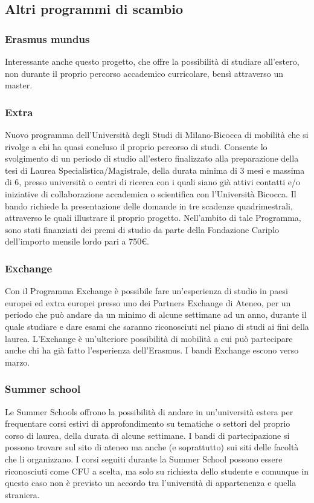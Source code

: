 \subsection{Altri programmi di scambio}
\subsubsection{Erasmus mundus}
Interessante anche questo progetto, che offre la possibilità di studiare all'estero, non durante il proprio percorso accademico curricolare, bensì attraverso un master. 

\subsubsection{Extra}
Nuovo programma dell'Università degli Studi di Milano-Bicocca di mobilità che si rivolge a chi ha quasi concluso il proprio percorso di studi. Consente lo svolgimento di un periodo di studio all'estero finalizzato alla preparazione della tesi di Laurea Specialistica/Magistrale, della durata minima di 3 mesi e massima di 6, presso università o centri di ricerca con i quali siano già attivi contatti e/o iniziative di collaborazione accademica o scientifica con l'Università Bicocca. 
Il bando richiede la presentazione delle domande in tre scadenze quadrimestrali, attraverso le quali illustrare il proprio progetto. Nell'ambito di tale Programma, sono stati finanziati dei premi di studio da parte della Fondazione Cariplo dell'importo mensile lordo pari a 750€. 

\subsubsection{Exchange}
Con il Programma Exchange è possibile fare un'esperienza di studio in paesi europei ed extra europei presso uno dei Partners Exchange di Ateneo, per un periodo che può andare da un minimo di alcune settimane ad un anno, durante il quale studiare e dare esami che saranno riconosciuti nel piano di studi ai fini della laurea. L'Exchange è un'ulteriore possibilità di mobilità a cui può partecipare anche chi ha già fatto l'esperienza dell'Erasmus. I bandi Exchange escono verso marzo. 

\subsubsection{Summer school}
Le Summer Schools offrono la possibilità di andare in un'università estera per frequentare corsi estivi di approfondimento su tematiche o settori del proprio corso di laurea, della durata di alcune settimane. I bandi di partecipazione si possono trovare sul sito di ateneo ma anche (e soprattutto) sui siti delle facoltà che li organizzano. I corsi seguiti durante la Summer School possono essere riconosciuti come CFU a scelta, ma solo su richiesta dello studente e comunque in questo caso non è previsto un accordo tra l'università di appartenenza e quella straniera. 
